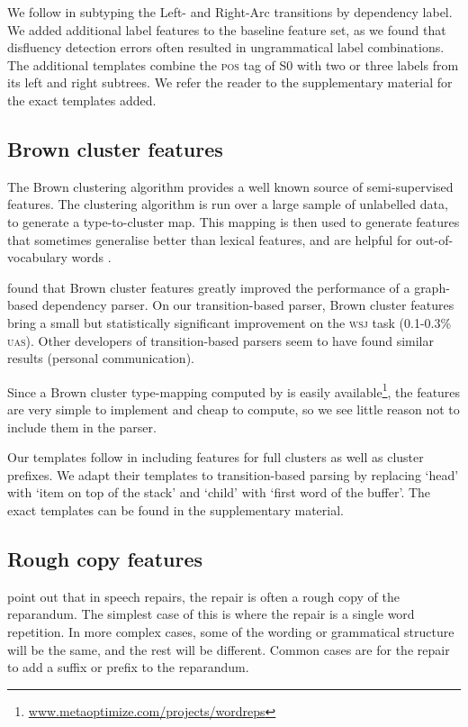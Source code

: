 \documentclass[11pt,letterpaper]{article}
\newcommand{\pos}{\textsc{pos}\xspace}
\newcommand{\szero}{S0\xspace}
\begin{document}
We follow \citet{zhang:cl11} in subtyping the Left- and Right-Arc transitions
by dependency label.  We added additional label features to the baseline feature
set, as we found that disfluency detection errors often resulted in ungrammatical
label combinations.  The additional templates combine the \pos tag of \szero with
two or three labels from its left and right subtrees. We refer the reader to the
supplementary material for the exact templates added.

\subsection{Brown cluster features}

The Brown clustering algorithm \citep{brown:92} provides a well known source
of semi-supervised features. The clustering algorithm is run over a large sample
of unlabelled data, to generate a type-to-cluster map. This mapping is then used
to generate features that sometimes generalise better than lexical features,
and are helpful for out-of-vocabulary words \citep{turian:10}.

\citet{koo:10} found that Brown cluster features greatly improved the performance
of a graph-based dependency parser. On our transition-based parser, Brown cluster
features bring a small but statistically significant improvement on the \textsc{wsj}
task (0.1-0.3\% \textsc{uas}).  Other developers of transition-based parsers
seem to have found similar results (personal communication).

Since a Brown cluster type-mapping computed by \citet{liang:05} is easily
available\footnote{\url{www.metaoptimize.com/projects/wordreps}}, the features
are very simple to implement and cheap to compute, so we see little reason not to include them
in the parser.

Our templates follow \citet{koo:10} in including features for full clusters as
well as cluster prefixes. We adapt their templates to transition-based parsing
by replacing `head' with `item on top of the stack' and `child' with `first word
of the buffer'. The exact templates can be found in the supplementary material.

\subsection{Rough copy features}

\citet{Johnson04a} point out that in speech repairs, the repair is often a rough
copy of the reparandum.  The simplest case of this is where the repair is a single
word repetition. In more complex cases, some of the wording or grammatical
structure will be the same, and the rest will be different.  Common cases
are for the repair to add a suffix or prefix to the reparandum.
\end{document}
